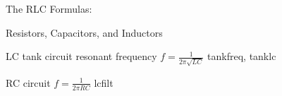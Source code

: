 \documentclass[fleqn]{article}
\newcommand\ddfrac[2]{\displaystyle \frac{\displaystyle #1}{\displaystyle #2}}
\begin{document}
	\begin{center}
	{\LARGE
	  {
	  	  The RLC Formulas:

	  	  Resistors, Capacitors, and Inductors
  	  }
    }
	\bigbreak
	
	LC tank circuit resonant frequency \smallbreak
	${f = \ddfrac{1}{2\pi \sqrt{LC}}}$ \break
	{\tiny {tankfreq, tanklc} } \bigbreak
	\smallbreak

	RC circuit \smallbreak
	$ f = \ddfrac{1}{2 \pi RC} $ \break
	{\tiny {lcfilt} } \bigbreak
	\end{center}
\end{document}
